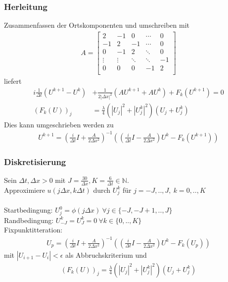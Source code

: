 \documentclass{beamer}
\begin{document}
\begin{frame}
    \frametitle{Herleitung}

    Zusammenfassen der Ortskomponenten und umschreiben mit 
    \begin{align*}
        A = \begin{bmatrix}
            2  & -1 &  0  &  \cdots  & 0 \\
            -1  & 2 &  -1  &  \cdots  & 0 \\
            0  & -1 &  2  &  \ddots  & 0 \\
            \vdots & \vdots & \ddots & \ddots & -1 \\
            0 & 0 & 0 & -1 & 2\\
        \end{bmatrix}
    \end{align*}
    liefert
    \begin{align*}
        i\frac{1}{\Delta t}(U^{k+1}-U^k)&+\frac{1}{2|\Delta x|^2}(AU^{k+1}+AU^k)+F_k(U^{k+1})=0\\
        (F_k(U))_j &= \frac{\lambda}{4}(|U_j|^2+|U_j^k|^2)(U_j+U_j^k)
    \end{align*}
    Dies kann umgeschrieben werden zu
    \begin{align*}
        U^{k+1} = (\frac{i}{\Delta t}I + \frac{A}{2\Delta x^2})^{-1}((\frac{i}{\Delta t}I - \frac{A}{2\Delta x^2})U^k - F_k(U^{k+1}))
    \end{align*}

\end{frame}

\begin{frame}
    \frametitle{Diskretisierung}

    Sein $\Delta t, \Delta x>0$ mit $J=\frac{30}{\Delta x},K=\frac{6}{\Delta t}\in\mathbb{N}$.\\
    Approximiere $u(j\Delta x, k\Delta t)$ durch $U_j^k$ f\"ur $j=-J, .. , J,\ k=0, .. , K$\\
    \ \\
    Startbedingung: $U_j^0=\phi(j\Delta x)\ \forall j\in\{-J, -J+1, .., J\}$\\
    Randbedingung: $U_{-J}^k=U_{J}^k=0\ \forall k\in\{0, .., K\}$\\
    Fixpunktitteration:
    \begin{align*}
        U_p = (\frac{i}{\Delta t}I + \frac{A}{2\Delta x^2})^{-1}((\frac{i}{\Delta t}I - \frac{A}{2\Delta x^2})U^k - F_k(U_p))
    \end{align*}
    mit $| U_{i+1}-U_{i} |<\epsilon$ als Abbruchskriterium und
    \begin{align*}
        (F_k(U))_j = \frac{\lambda}{4}(|U_j|^2+|U_j^k|^2)(U_j+U_j^k)
    \end{align*}
\end{frame}
\end{document}
